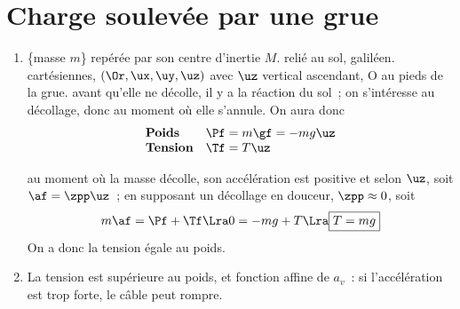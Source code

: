 \documentclass[a4paper, 12pt, final, garamond]{book}
\begin{document}
\section{Charge soulevée par une grue}
\begin{enumerate}
    \item 
        \begin{itemize}[label=$\diamond$, leftmargin=10pt]
             \{masse $m$\} repérée par son centre d'inertie $M$.
             relié au sol, galiléen.
             cartésiennes, $(\Or,\ux,\uy,\uz)$ avec $\uz$
                vertical ascendant, O au pieds de la grue.
             avant qu'elle ne décolle, il y a la réaction du sol~; on
                s'intéresse au décollage, donc au moment où elle s'annule. On
                aura donc
                \[
                    \begin{array}{ll}
                        \textbf{Poids} & \Pf = m\gf = -mg\uz\\
                        \textbf{Tension} & \Tf = T\uz
                    \end{array}
                \]

             au moment où la masse décolle, son accélération est
                positive et selon $\uz$, soit $\af = \zpp\uz$~; en supposant un
                décollage en douceur, $\zpp \approx 0$, soit
                \[
                    m\af = \Pf + \Tf
                    \Lra
                    0 = -mg + T
                    \Lra
                    \boxed{T = mg}
                \]
                On a donc la tension égale au poids.
        \end{itemize}
    \item {}
        \smallbreak
        La tension est supérieure au poids, et fonction affine de $a_v$~: si
        l'accélération est trop forte, le câble peut rompre.
\end{enumerate}
\hspace*{-0.75cm}
\end{document}
